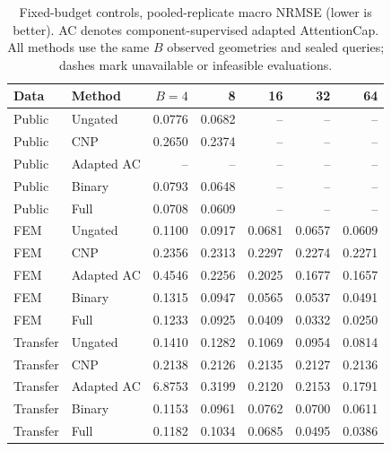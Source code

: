 \begin{table}[t]
\centering
\caption{Fixed-budget controls, pooled-replicate macro NRMSE (lower is better). AC denotes component-supervised adapted AttentionCap. All methods use the same $B$ observed geometries and sealed queries; dashes mark unavailable or infeasible evaluations.}
\label{tab:budget_controls}
\footnotesize\setlength{\tabcolsep}{2pt}
\begin{tabular}{llrrrrr}
\toprule
Data & Method & $B=4$ & 8 & 16 & 32 & 64 \\
\midrule
Public & Ungated & 0.0776 & 0.0682 & -- & -- & -- \\
Public & CNP & 0.2650 & 0.2374 & -- & -- & -- \\
Public & Adapted AC & -- & -- & -- & -- & -- \\
Public & Binary & 0.0793 & 0.0648 & -- & -- & -- \\
Public & Full & 0.0708 & 0.0609 & -- & -- & -- \\
\midrule
FEM & Ungated & 0.1100 & 0.0917 & 0.0681 & 0.0657 & 0.0609 \\
FEM & CNP & 0.2356 & 0.2313 & 0.2297 & 0.2274 & 0.2271 \\
FEM & Adapted AC & 0.4546 & 0.2256 & 0.2025 & 0.1677 & 0.1657 \\
FEM & Binary & 0.1315 & 0.0947 & 0.0565 & 0.0537 & 0.0491 \\
FEM & Full & 0.1233 & 0.0925 & 0.0409 & 0.0332 & 0.0250 \\
\midrule
Transfer & Ungated & 0.1410 & 0.1282 & 0.1069 & 0.0954 & 0.0814 \\
Transfer & CNP & 0.2138 & 0.2126 & 0.2135 & 0.2127 & 0.2136 \\
Transfer & Adapted AC & 6.8753 & 0.3199 & 0.2120 & 0.2153 & 0.1791 \\
Transfer & Binary & 0.1153 & 0.0961 & 0.0762 & 0.0700 & 0.0611 \\
Transfer & Full & 0.1182 & 0.1034 & 0.0685 & 0.0495 & 0.0386 \\
\bottomrule
\end{tabular}
\end{table}
